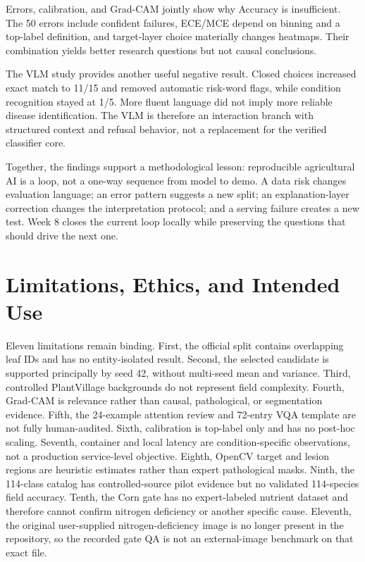 \documentclass[11pt]{article}
\begin{document}
Errors, calibration, and Grad-CAM jointly show why Accuracy is insufficient. The 50 errors include confident failures, ECE/MCE depend on binning and a top-label definition, and target-layer choice materially changes heatmaps. Their combination yields better research questions but not causal conclusions.

The VLM study provides another useful negative result. Closed choices increased exact match to 11/15 and removed automatic risk-word flags, while condition recognition stayed at 1/5. More fluent language did not imply more reliable disease identification. The VLM is therefore an interaction branch with structured context and refusal behavior, not a replacement for the verified classifier core.

Together, the findings support a methodological lesson: reproducible agricultural AI is a loop, not a one-way sequence from model to demo. A data risk changes evaluation language; an error pattern suggests a new split; an explanation-layer correction changes the interpretation protocol; and a serving failure creates a new test. Week 8 closes the current loop locally while preserving the questions that should drive the next one.

\section{Limitations, Ethics, and Intended Use}

Eleven limitations remain binding. First, the official split contains \PDAOfficialOverlap{} overlapping leaf IDs and has no entity-isolated result. Second, the selected candidate is supported principally by seed 42, without multi-seed mean and variance. Third, controlled PlantVillage backgrounds do not represent field complexity. Fourth, Grad-CAM is relevance rather than causal, pathological, or segmentation evidence. Fifth, the 24-example attention review and 72-entry VQA template are not fully human-audited. Sixth, calibration is top-label only and has no post-hoc scaling. Seventh, container and local latency are condition-specific observations, not a production service-level objective. Eighth, OpenCV target and lesion regions are heuristic estimates rather than expert pathological masks. Ninth, the 114-class catalog has controlled-source pilot evidence but no validated 114-species field accuracy. Tenth, the Corn gate has no expert-labeled nutrient dataset and therefore cannot confirm nitrogen deficiency or another specific cause. Eleventh, the original user-supplied nitrogen-deficiency image is no longer present in the repository, so the recorded gate QA is not an external-image benchmark on that exact file.
\end{document}
